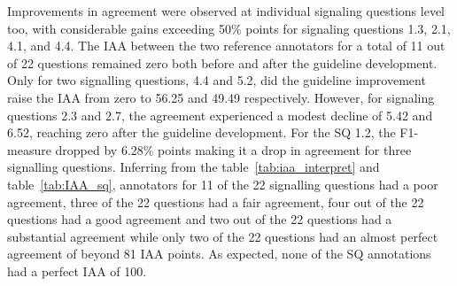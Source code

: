 \documentclass[sn-mathphys,Numbered]{sn-jnl}%
\theoremstyle{thmstyleone}%
\theoremstyle{thmstyletwo}%
\theoremstyle{thmstylethree}%
\begin{document}
Improvements in agreement were observed at individual signaling questions level too, with considerable gains exceeding 50\% points for signaling questions 1.3, 2.1, 4.1, and 4.4.
The IAA between the two reference annotators for a total of 11 out of 22 questions remained zero both before and after the guideline development.
Only for two signalling questions, 4.4 and 5.2, did the guideline improvement raise the IAA from zero to 56.25 and 49.49 respectively.
However, for signaling questions 2.3 and 2.7, the agreement experienced a modest decline of 5.42 and 6.52, reaching zero after the guideline development.
For the SQ 1.2, the F1-measure dropped by 6.28\% points making it a drop in agreement for three signalling questions.
Inferring from the table~\ref{tab:iaa_interpret} and table~\ref{tab:IAA_sq}, annotators for 11 of the 22 signalling questions had a poor agreement, three of the 22 questions had a fair agreement, four out of the 22 questions had a good agreement and two out of the 22 questions had a substantial agreement while only two of the 22 questions had an almost perfect agreement of beyond 81 IAA points.
As expected, none of the SQ annotations had a perfect IAA of 100.
%
%
%
\end{document}
